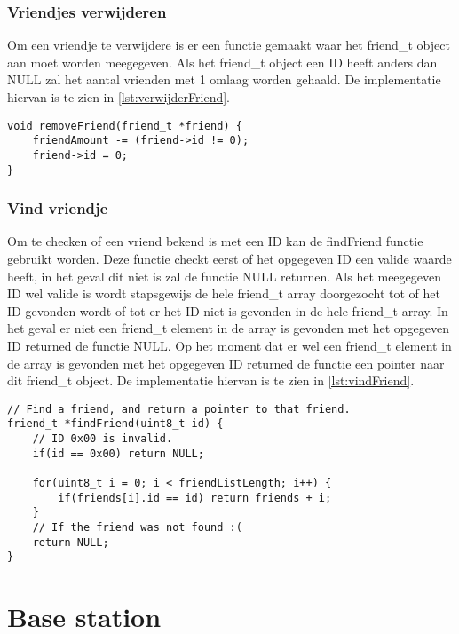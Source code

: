     \subsubsection{Vriendjes verwijderen}
        Om een vriendje te verwijdere is er een functie gemaakt waar het friend\_t object aan moet worden meegegeven. Als het friend\_t object een ID heeft anders dan NULL zal het aantal vrienden met 1 omlaag worden gehaald. De implementatie hiervan is te zien in \autoref{lst:verwijderFriend}.
        \begin{lstlisting}[caption={Verwijder vriendje},captionpos=b,label={lst:verwijderFriend},style=c,xleftmargin=.\textwidth,xrightmargin=.\textwidth]
void removeFriend(friend_t *friend) {
    friendAmount -= (friend->id != 0);
    friend->id = 0;
}
        \end{lstlisting}

    \subsubsection{Vind vriendje}
        Om te checken of een vriend bekend is met een ID kan de findFriend functie gebruikt worden. Deze functie checkt eerst of het opgegeven ID een valide waarde heeft, in het geval dit niet is zal de functie NULL returnen. Als het meegegeven ID wel valide is wordt stapsgewijs de hele friend\_t array doorgezocht tot of het ID gevonden wordt of tot er het ID niet is gevonden in de hele friend\_t array. In het geval er niet een friend\_t element in de array is gevonden met het opgegeven ID returned de functie NULL. Op het moment dat er wel een friend\_t element in de array is gevonden met het opgegeven ID returned de functie een pointer naar dit friend\_t object. De implementatie hiervan is te zien in \autoref{lst:vindFriend}.
        \begin{lstlisting}[caption={Vind vriendje},captionpos=b,label={lst:vindFriend},style=c,xleftmargin=.\textwidth,xrightmargin=.\textwidth]
// Find a friend, and return a pointer to that friend.
friend_t *findFriend(uint8_t id) {
    // ID 0x00 is invalid.   
    if(id == 0x00) return NULL;

    for(uint8_t i = 0; i < friendListLength; i++) {
        if(friends[i].id == id) return friends + i;
    }
    // If the friend was not found :(
    return NULL;
}
        \end{lstlisting}

\section{Base station}
